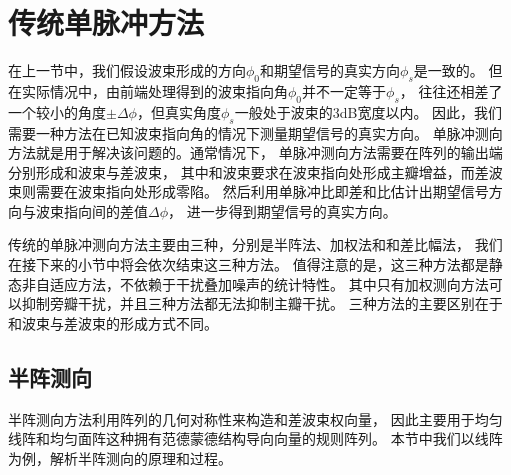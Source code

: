 \documentclass[master]{thesis-uestc}
\begin{document}

\section{传统单脉冲方法}
在上一节中，我们假设波束形成的方向$\phi_0$和期望信号的真实方向$\phi_s$是一致的。
但在实际情况中，由前端处理得到的波束指向角$\phi_0$并不一定等于$\phi_s$，
往往还相差了一个较小的角度$\pm\Delta\phi$，但真实角度$\phi_s$一般处于波束的$3$dB宽度以内。
因此，我们需要一种方法在已知波束指向角的情况下测量期望信号的真实方向。
单脉冲测向方法就是用于解决该问题的。通常情况下，
单脉冲测向方法需要在阵列的输出端分别形成和波束与差波束，
其中和波束要求在波束指向处形成主瓣增益，而差波束则需要在波束指向处形成零陷。
然后利用单脉冲比即差和比估计出期望信号方向与波束指向间的差值$\Delta\phi$，
进一步得到期望信号的真实方向。

传统的单脉冲测向方法主要由三种，分别是半阵法、加权法和和差比幅法，
我们在接下来的小节中将会依次结束这三种方法。
值得注意的是，这三种方法都是静态非自适应方法，不依赖于干扰叠加噪声的统计特性。
其中只有加权测向方法可以抑制旁瓣干扰，并且三种方法都无法抑制主瓣干扰。
三种方法的主要区别在于和波束与差波束的形成方式不同。

\subsection{半阵测向}
半阵测向方法利用阵列的几何对称性来构造和差波束权向量，
因此主要用于均匀线阵和均匀面阵这种拥有范德蒙德结构导向向量的规则阵列。
本节中我们以线阵为例，解析半阵测向的原理和过程。
\end{document}
